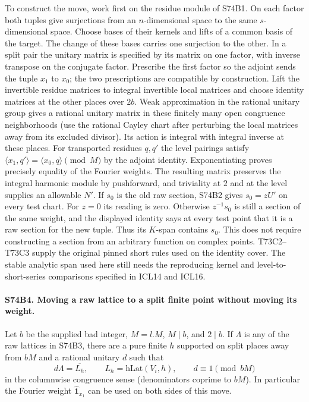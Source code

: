 To construct the move, work first on the residue module of S74B1.
On each factor both tuples give surjections from an $n$-dimensional
space to the same $s$-dimensional space. Choose bases of their
kernels and lifts of a common basis of the target. The change of
these bases carries one surjection to the other. In a split pair the
unitary matrix is specified by its matrix on one factor, with inverse
transpose on the conjugate factor. Prescribe the first factor so the
adjoint sends the tuple $x_1$ to $x_0$; the two prescriptions are
compatible by construction. Lift the invertible residue matrices to
integral invertible local matrices and choose identity matrices at
the other places over $2b$. Weak approximation in the rational
unitary group gives a rational unitary matrix in these finitely many
open congruence neighborhoods (use the rational Cayley chart after
perturbing the local matrices away from its excluded divisor).
Its action is integral with integral inverse at these places. For
transported residues $q,q'$ the level pairings satisfy
$\langle x_1,q'\rangle=\langle x_0,q\rangle\pmod M$ by the
adjoint identity. Exponentiating proves precisely equality of the
Fourier weights. The resulting matrix preserves the integral
harmonic module by pushforward, and
triviality at $2$ and at the level supplies an allowable $N'$.
If $s_0$ is the old raw section, S74B2 gives $s_0=zU'$ on every test
chart. For $z=0$ its reading is zero. Otherwise $z^{-1}s_0$ is still
a section of the same weight, and the displayed identity says at
every test point that it is a raw section for the new tuple. Thus its
$K$-span contains $s_0$. This does not require constructing a
section from an arbitrary function on complex points. T73C2--T73C3
supply the original pinned short rules used on the identity cover.
The stable analytic span used here still needs the reproducing
kernel and level-to-short-series comparisons specified in ICL14 and
ICL16.

\paragraph{S74B4. Moving a raw lattice to a split finite point without moving its weight.}
Let $b$ be the supplied bad integer, $M=l.M$, $M\mid b$, and
$2\mid b$. If $\Lambda$ is any of the raw lattices in S74B3,
there are a pure finite $h$ supported on split places away from $bM$
and a rational unitary $d$ such that
\[
       d\Lambda=\overline{L_h},\qquad
       L_h=\mathrm{hLat}(V_i,h),\qquad d\equiv1\pmod{bM}
\]
in the columnwise congruence sense (denominators coprime to $bM$).
In particular the Fourier weight $\widehat{\mathbf1}_{x_1}$ can be
used on both sides of this move.

